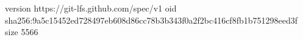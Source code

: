 version https://git-lfs.github.com/spec/v1
oid sha256:9a5c15452ed728497eb608d86cc78b3b343f0a2f2bc416cf8fb1b751298eed3f
size 5566
